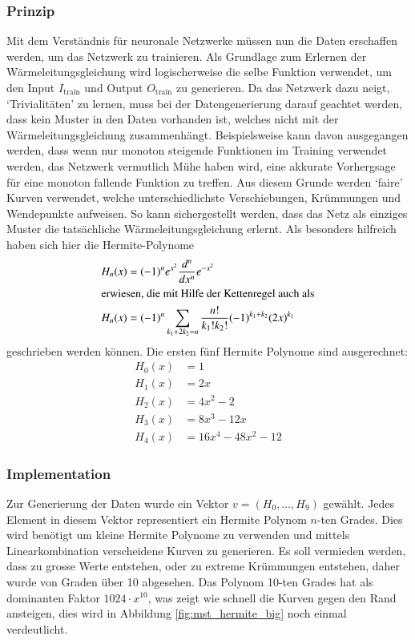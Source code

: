 \subsubsection{Prinzip}
Mit dem Verständnis für neuronale Netzwerke müssen nun die Daten
erschaffen werden, um das Netzwerk zu trainieren. Als Grundlage zum
Erlernen der Wärmeleitungsgleichung wird logischerweise die selbe
Funktion verwendet, um den Input $I_{\text{train}}$ und Output
$O_{\text{train}}$ zu generieren. Da das Netzwerk dazu neigt,
`Trivialitäten' zu lernen, muss bei der Datengenerierung darauf geachtet
werden, dass kein Muster in den Daten vorhanden ist, welches nicht
mit der Wärmeleitungsgleichung zusammenhängt. Beispielsweise kann
davon ausgegangen werden, dass wenn nur monoton steigende Funktionen
im Training verwendet werden, das Netzwerk vermutlich Mühe haben wird,
eine akkurate Vorhergsage für eine monoton fallende Funktion zu
treffen. Aus diesem Grunde werden `faire' Kurven verwendet, welche
unterschiedlichste Verschiebungen, Krümmungen und Wendepunkte
aufweisen. So kann sichergestellt werden, dass das Netz als einziges
Muster die tatsächliche Wärmeleitungsgleichung erlernt. Als besonders
hilfreich haben sich hier die Hermite-Polynome
\begin{align}
	H_n(x) &=(-1)^{n}e^{x^{2}}{\frac {d^{n}}{d x^{n}}}e^{-x^{2}}
	\\
	\intertext{erwiesen, die mit Hilfe der Kettenregel auch als}
	H_n(x) &=(-1)^{n}\sum _{k_{1}+2k_{2}=n}{\frac {n!}{k_{1}!k_{2}!}}(-1)^{k_{1}+k_{2}}(2x)^{k_{1}}
\end{align}
geschrieben werden können.
Die ersten fünf Hermite Polynome sind ausgerechnet:
\begin{align}
H_{0}(x) &= 1\\
H_{1}(x) &= 2x\\
H_{2}(x) &= 4x^{2}-2\\
H_{3}(x) &= 8x^{3}-12x\\
H_{4}(x) &= 16x^{4}-48x^{2}-12
\end{align}

\subsubsection{Implementation}
Zur Generierung der Daten wurde ein Vektor $v=(H_0, \dots ,H_9)$ gewählt. Jedes Element in diesem Vektor representiert ein Hermite Polynom $n$-ten Grades. Dies wird benötigt um kleine Hermite Polynome zu verwenden und mittels Linearkombination verscheidene Kurven zu generieren. Es soll vermieden werden, dass zu grosse Werte entstehen, oder zu extreme Krümmungen entstehen, daher wurde von Graden über 10 abgesehen. Das Polynom 10-ten Grades hat als dominanten Faktor $1024 \cdot x^{10}$, was zeigt wie schnell die Kurven gegen den Rand ansteigen, dies wird in Abbildung \ref{fig:mst_hermite_big} noch einmal verdeutlicht.

